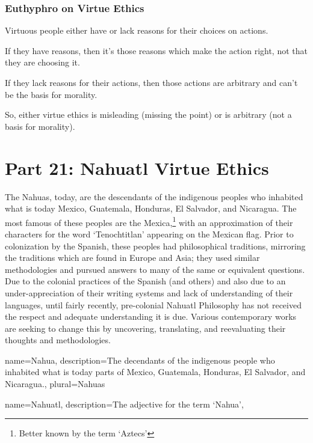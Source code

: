 \subsection{Euthyphro on Virtue Ethics}
\begin{earg}
    \item[1] Virtuous people either have or lack reasons for their choices on actions.
    \item[2] If they have reasons, then it’s those reasons which make the action right, not that they are choosing it.
    \item[3] If they lack reasons for their actions, then those actions are arbitrary and can’t be the basis for morality.
    \item[4] So, either virtue ethics is misleading (missing the point) or is arbitrary (not a basis for morality).
\end{earg}

\chapter{Part 21: Nahuatl Virtue Ethics}

The \glspl{Nahua}, today, are the descendants of the indigenous peoples who inhabited what is today Mexico, Guatemala, Honduras, El Salvador, and Nicaragua. The most famous of these peoples are the Mexica,\footnote{Better known by the term `Aztecs'} with an approximation of their characters for the word `Tenochtitlan' appearing on the Mexican flag. Prior to colonization by the Spanish, these peoples had philosophical traditions, mirroring the traditions which are found in Europe and Asia; they used similar methodologies and pursued answers to many of the same or equivalent questions. Due to the colonial practices of the Spanish (and others) and also due to an under-appreciation of their writing systems and lack of understanding of their languages, until fairly recently, pre-colonial \gls{Nahuatl} Philosophy has not received the respect and adequate understanding it is due. Various contemporary works are seeking to change this by uncovering, translating, and reevaluating their thoughts and methodologies. 

{
  name=Nahua,
  description={The decendants of the indigenous people who inhabited what is today parts of Mexico, Guatemala, Honduras, El Salvador, and Nicaragua.},
  plural=Nahuas
}

{
  name=Nahuatl,
  description={The adjective for the term `Nahua'},
}


